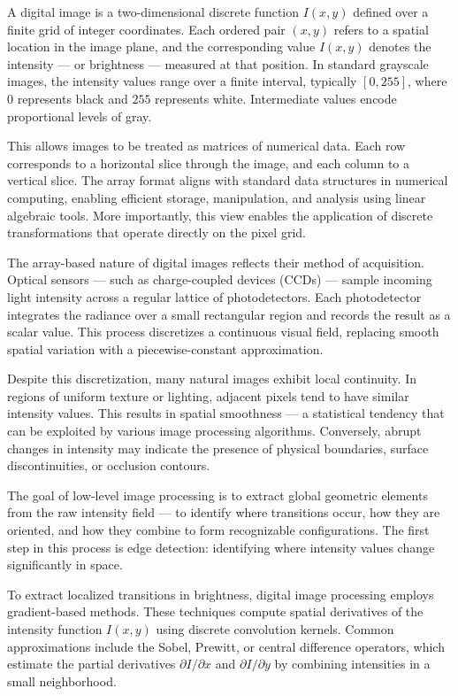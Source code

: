 A digital image is a two-dimensional discrete function $I(x, y)$ defined over a finite grid of integer coordinates. Each ordered pair $(x, y)$ refers to a spatial location in the image plane, and the corresponding value $I(x, y)$ denotes the intensity — or brightness — measured at that position. In standard grayscale images, the intensity values range over a finite interval, typically $[0, 255]$, where $0$ represents black and $255$ represents white. Intermediate values encode proportional levels of gray.

This allows images to be treated as matrices of numerical data. Each row corresponds to a horizontal slice through the image, and each column to a vertical slice. The array format aligns with standard data structures in numerical computing, enabling efficient storage, manipulation, and analysis using linear algebraic tools. More importantly, this view enables the application of discrete transformations that operate directly on the pixel grid.

The array-based nature of digital images reflects their method of acquisition. Optical sensors — such as charge-coupled devices (CCDs) — sample incoming light intensity across a regular lattice of photodetectors. Each photodetector integrates the radiance over a small rectangular region and records the result as a scalar value. This process discretizes a continuous visual field, replacing smooth spatial variation with a piecewise-constant approximation.

Despite this discretization, many natural images exhibit local continuity. In regions of uniform texture or lighting, adjacent pixels tend to have similar intensity values. This results in spatial smoothness — a statistical tendency that can be exploited by various image processing algorithms. Conversely, abrupt changes in intensity may indicate the presence of physical boundaries, surface discontinuities, or occlusion contours.

The goal of low-level image processing is to extract global geometric elements from the raw intensity field — to identify where transitions occur, how they are oriented, and how they combine to form recognizable configurations. The first step in this process is edge detection: identifying where intensity values change significantly in space.

To extract localized transitions in brightness, digital image processing employs gradient-based methods. These techniques compute spatial derivatives of the intensity function $I(x, y)$ using discrete convolution kernels. Common approximations include the Sobel, Prewitt, or central difference operators, which estimate the partial derivatives $\partial I / \partial x$ and $\partial I / \partial y$ by combining intensities in a small neighborhood.

